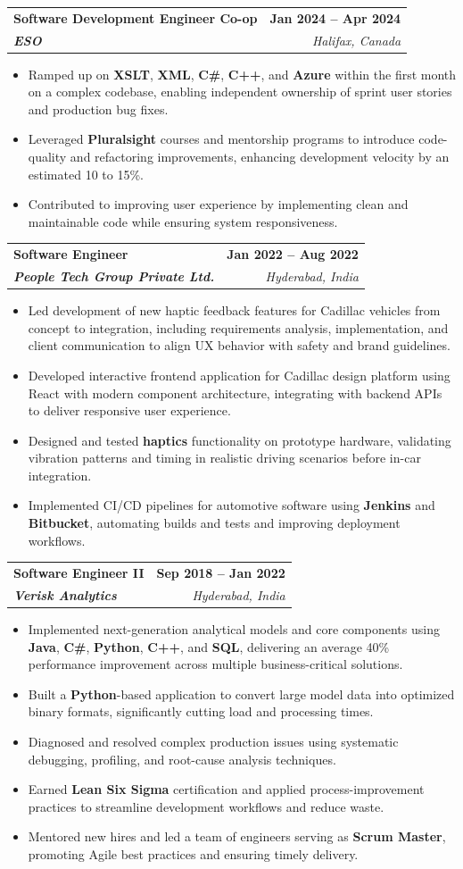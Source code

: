 \documentclass[letterpaper,11pt]{article}
\makeatletter
\newcommand{\resumeItem}[1]{
  \item\small{
    {#1 \vspace{-2pt}}
  }
}
\newcommand{\resumeSubheading}[4]{
  \vspace{-2pt}\item
    \begin{tabular*}{1.0\textwidth}[t]{l@{\extracolsep{\fill}}r}
      \textbf{#1} & \textbf{\small #2} \\
      \textit{\small#3} & \textit{\small #4} \\
    \end{tabular*}\vspace{-7pt}
}
\newcommand{\resumeItemListStart}{\begin{itemize}}
\newcommand{\resumeItemListEnd}{\end{itemize}\vspace{-5pt}}
\makeatother
\begin{document}
    \resumeSubheading
      {\textbf{Software Development Engineer Co-op}}{\textbf{Jan 2024 -- Apr 2024}}
      {\textbf{ESO}}{Halifax, Canada}
      \resumeItemListStart
        \resumeItem{Ramped up on \textbf{XSLT}, \textbf{XML}, \textbf{C\#}, \textbf{C++}, and \textbf{Azure} within the first month on a complex codebase, enabling independent ownership of sprint user stories and production bug fixes.}
        \resumeItem{Leveraged \textbf{Pluralsight} courses and mentorship programs to introduce code-quality and refactoring improvements, enhancing development velocity by an estimated 10 to 15\%.}
        \resumeItem{Contributed to improving user experience by implementing clean and maintainable code while ensuring system responsiveness.}
      \resumeItemListEnd

    \resumeSubheading
      {\textbf{Software Engineer}}{\textbf{Jan 2022 -- Aug 2022}}
      {\textbf{People Tech Group Private Ltd.}}{Hyderabad, India}
      \resumeItemListStart
        \resumeItem{Led development of new haptic feedback features for Cadillac vehicles from concept to integration, including requirements analysis, implementation, and client communication to align UX behavior with safety and brand guidelines.}
        \resumeItem{Developed interactive frontend application for Cadillac design platform using React with modern component architecture, integrating with backend APIs to deliver responsive user experience.}
        \resumeItem{Designed and tested \textbf{haptics} functionality on prototype hardware, validating vibration patterns and timing in realistic driving scenarios before in-car integration.}
        \resumeItem{Implemented CI/CD pipelines for automotive software using \textbf{Jenkins} and \textbf{Bitbucket}, automating builds and tests and improving deployment workflows.}
      \resumeItemListEnd

    \resumeSubheading
      {\textbf{Software Engineer II}}{\textbf{Sep 2018 -- Jan 2022}}
      {\textbf{Verisk Analytics}}{Hyderabad, India}
      \resumeItemListStart
        \resumeItem{Implemented next-generation analytical models and core components using \textbf{Java}, \textbf{C\#}, \textbf{Python}, \textbf{C++}, and \textbf{SQL}, delivering an average 40\% performance improvement across multiple business-critical solutions.}
        \resumeItem{Built a \textbf{Python}-based application to convert large model data into optimized binary formats, significantly cutting load and processing times.}
        \resumeItem{Diagnosed and resolved complex production issues using systematic debugging, profiling, and root-cause analysis techniques.}
        \resumeItem{Earned \textbf{Lean Six Sigma} certification and applied process-improvement practices to streamline development workflows and reduce waste.}
        \resumeItem{Mentored new hires and led a team of engineers serving as \textbf{Scrum Master}, promoting Agile best practices and ensuring timely delivery.}
      \resumeItemListEnd
\end{document}
